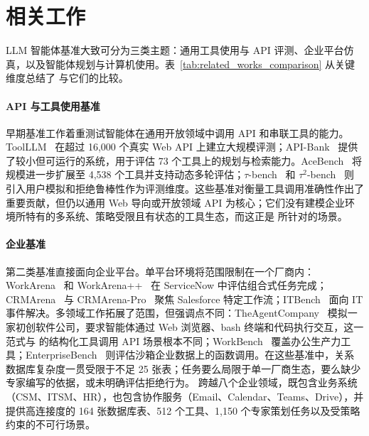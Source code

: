 \section{相关工作}



LLM 智能体基准大致可分为三类主题：通用工具使用与 API 评测、企业平台仿真，以及智能体规划与计算机使用。表~\ref{tab:related_works_comparison} 从关键维度总结了 \dataset{} 与它们的比较。

\paragraph{API 与工具使用基准}
早期基准工作着重测试智能体在通用开放领域中调用 API 和串联工具的能力。ToolLLM~\citep{qin2024toolllm} 在超过 16,000 个真实 Web API 上建立大规模评测；API-Bank~\citep{li-etal-2023-api} 提供了较小但可运行的系统，用于评估 73 个工具上的规划与检索能力。AceBench~\citep{chen2025acebenchwinsmatchpoint} 将规模进一步扩展至 4,538 个工具并支持动态多轮评估；$\tau$-bench~\citep{yao2024taubenchbenchmarktoolagentuserinteraction} 和 $\tau^2$-bench~\citep{barres2025tau2} 则引入用户模拟和拒绝鲁棒性作为评测维度。这些基准对衡量工具调用准确性作出了重要贡献，但仍以通用 Web 导向或开放领域 API 为核心；它们没有建模企业环境所特有的多系统、策略受限且有状态的工具生态，而这正是 \ours{} 所针对的场景。

\paragraph{企业基准}
第二类基准直接面向企业平台。单平台环境将范围限制在一个厂商内：WorkArena~\citep{workarena2024} 和 WorkArena++~\citep{boisvert2024workarenacompositionalplanningreasoningbased} 在 ServiceNow 中评估组合式任务完成；CRMArena~\citep{huang-etal-2025-crmarena} 与 CRMArena-Pro~\citep{huang-etal-2025-crmarena-pro} 聚焦 Salesforce 特定工作流；ITBench~\citep{jha2025itbenchevaluatingaiagents} 面向 IT 事件解决。多领域工作拓展了范围，但强调点不同：TheAgentCompany~\citep{xu2024theagentcompanybenchmarkingllmagents} 模拟一家初创软件公司，要求智能体通过 Web 浏览器、bash 终端和代码执行交互，这一范式与 \ours{} 的结构化工具调用 API 场景根本不同；WorkBench~\citep{styles2024workbenchbenchmarkdatasetagents} 覆盖办公生产力工具；EnterpriseBench~\citep{vishwakarma2025llmshelpworksandbox} 则评估沙箱企业数据上的函数调用。在这些基准中，关系数据库复杂度一贯受限于不足 25 张表；任务要么局限于单一厂商生态，要么缺少专家编写的依据，或未明确评估拒绝行为。\ours{} 跨越八个企业领域，既包含业务系统（CSM、ITSM、HR），也包含协作服务（Email、Calendar、Teams、Drive），并提供高连接度的 164 张数据库表、512 个工具、1,150 个专家策划任务以及受策略约束的不可行场景。

